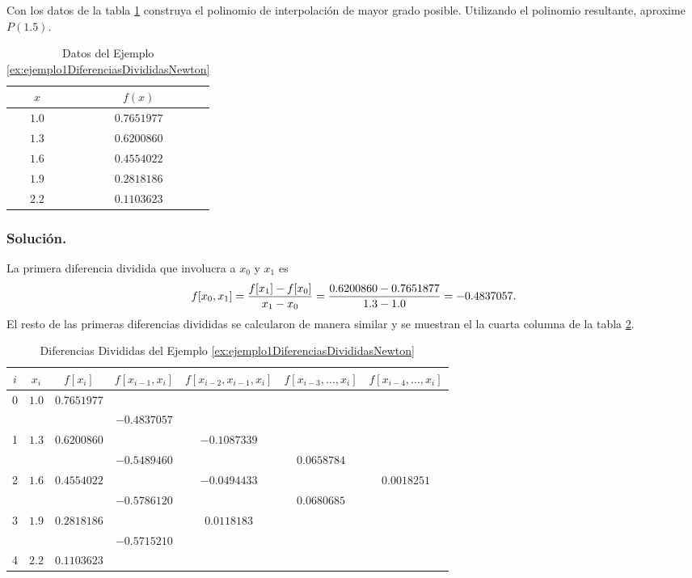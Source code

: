 \begin{exerciseT}
\label{ex:ejemplo1DiferenciasDivididasNewton}
Con los datos de la tabla \ref{table:ejemplo1ADiferenciasDivididasNewton} construya el 
		polinomio de interpolación de mayor grado posible. Utilizando el polinomio resultante, aproxime $P(1.5)$.
	
	\begin{table}[H]
		\label{table:ejemplo1ADiferenciasDivididasNewton}
		\centering
		\begin{tabular}{cc}
			\toprule
			$x$ & $f(x)$\\
			\midrule
			$1.0$ & $0.7651977$ \\
			$1.3$ & $0.6200860$ \\
			$1.6$ & $0.4554022$ \\
			$1.9$ & $0.2818186$ \\
			$2.2$ & $0.1103623$ \\
			\bottomrule
      	\end{tabular}
      	\caption{Datos del Ejemplo \ref{ex:ejemplo1DiferenciasDivididasNewton}}
	\end{table}	
	
	\subsubsection*{Solución.} La primera diferencia dividida que involucra a $x_0$ y $x_1$ es
		$$f[x_0,x_1] = {f[x_1] - f[x_0]\over x_1 - x_0} = {0.6200860-0.7651877\over 1.3-1.0} = -0.4837057.$$
		El resto de las primeras diferencias divididas se calcularon de manera similar y se muestran el la cuarta columna de la tabla
		\ref{table:ejemplo1BDiferenciasDivididasNewton}.
	
	\begin{table}[H]
		\centering
      	\begin{tabular}{ccccccc}
      		\toprule
      		$i$ & $x_i$ & $f[x_i]$ & $f[x_{i-1}, x_i]$ & $f[x_{i-2},x_{i-1},x_i]$ & $f[x_{i-3},\dots,x_i]$ & $f[x_{i-4},\dots, x_i]$\\
			\midrule
			0 & $1.0$ & $0.7651977$ & & & & \\ 
			&&&$-0.4837057$&&&\\
			1 & $1.3$ & $0.6200860$ &  & $-0.1087339$ & & \\
			&&&$-0.5489460$&&$0.0658784$&\\
			2 & $1.6$ & $0.4554022$ &  & $-0.0494433$ & & $0.0018251$\\
			&&&$-0.5786120$&&$0.0680685$&\\
			3 & $1.9$ & $0.2818186$ &  & $ 0.0118183$ &  & \\
			&&&$-0.5715210$&&&\\
			4 & $2.2$ & $0.1103623$ &  &  &  &  \\
			\bottomrule
      	\end{tabular}
      	\caption{Diferencias Divididas del Ejemplo \ref{ex:ejemplo1DiferenciasDivididasNewton}}
      	\label{table:ejemplo1BDiferenciasDivididasNewton}
	\end{table}
	

\end{exerciseT}
